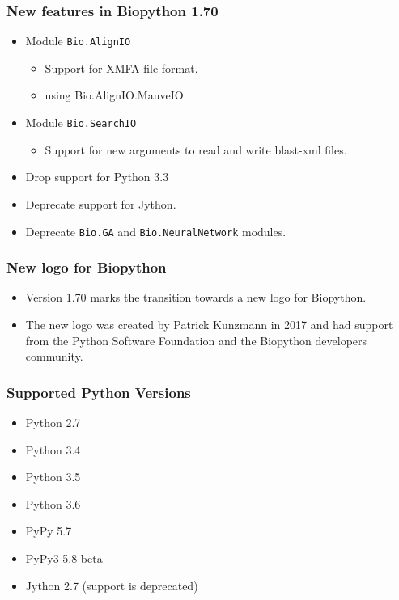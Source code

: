 \documentclass[trans]{beamer}
\def\Arrow{\raisebox{-.5\height}{\scalebox{4}{$\rightarrow$}}}
\def\Image#1{\raisebox{-.5\height}{\texttt{[image: \#1]}}}
\begin{document}
\frame
{
  \frametitle{New features in Biopython 1.70}

  \begin{itemize}
  \item Module \texttt{Bio.AlignIO}
  \begin{itemize}
  \item Support for XMFA file format.
  \item using Bio.AlignIO.MauveIO
  \end{itemize}
  \end{itemize}
  \begin{itemize}
  \item Module \texttt{Bio.SearchIO}
  \begin{itemize}
  \item Support for new arguments to read and write blast-xml files.
  \end{itemize}
  \item Drop support for Python 3.3
  \item Deprecate support for Jython.
  \item Deprecate \texttt{Bio.GA} and \texttt{Bio.NeuralNetwork} modules.
  \end{itemize}

}
\frame
{
  \frametitle{New logo for Biopython}

  \begin{itemize}
  \item Version 1.70 marks the transition towards a new logo for Biopython.

  \Image{figures/biopython.jpg}\hspace{1em}\Arrow\hspace{1em}
  \Image{figures/biopython_logo_s.png}

  \item The new logo was created by Patrick Kunzmann in 2017 and had support from the Python Software Foundation and the Biopython developers community.
  \end{itemize}

}
\frame
{
  \frametitle{Supported Python Versions}

  \begin{itemize}
  \item Python 2.7
  \item Python 3.4
  \item Python 3.5
  \item Python 3.6
  \item PyPy 5.7
  \item PyPy3 5.8 beta
  \item Jython 2.7 (support is deprecated)
  \end{itemize}
}
\end{document}
